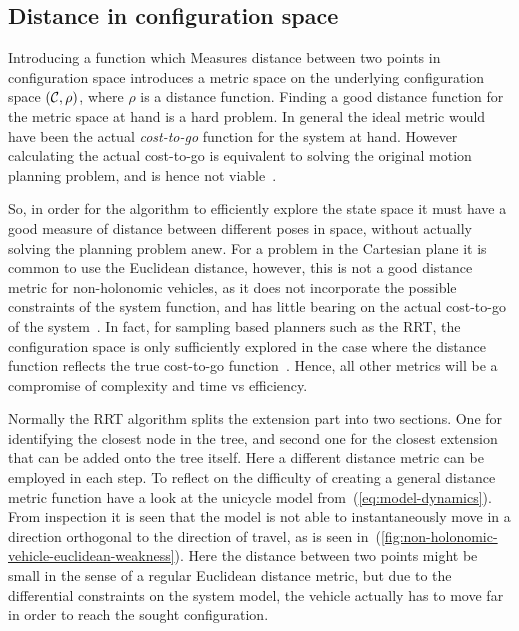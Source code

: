 \subsection{Distance in configuration space}

Introducing a function which Measures distance between two points in
configuration space introduces a metric space on the underlying configuration
space \((\mathcal{C}{},\rho)\), where \(\rho\) is a distance
function. Finding a good distance function for the metric space at hand is a
hard problem. In general the ideal metric would have been the actual
\textit{cost-to-go} function for the system at hand. However calculating the
actual cost-to-go is equivalent to solving the original motion planning problem,
and is hence not viable~\cite{pengchengReducingMetricSensitivity2001}.

So, in order for the \rrtfunnel{} algorithm to efficiently explore the state
space it must have a good measure of distance between different poses in space,
without actually solving the planning problem anew. For a problem in the
Cartesian plane it is common to use the Euclidean distance, however, this is not
a good distance metric for non-holonomic vehicles, as it does not incorporate
the possible constraints of the system function, and has little bearing on the
actual cost-to-go of the system~\cite{parkFeedbackMotionPlanning2015}. In fact,
for sampling based planners such as the \ac{RRT}, the configuration space is
only sufficiently explored in the case where the distance function reflects the
true cost-to-go function~\cite{pengchengReducingMetricSensitivity2001}. Hence,
all other metrics will be a compromise of complexity and time vs efficiency.

Normally the \ac{RRT} algorithm splits the extension part into two sections. One
for identifying the closest node in the tree, and second one for the closest
extension that can be added onto the tree itself. Here a different distance
metric can be employed in each step. To reflect on the difficulty of creating a
general distance metric function have a look at the unicycle model
from~(\ref{eq:model-dynamics}). From inspection it is seen that the model is not
able to instantaneously move in a direction orthogonal to the direction of
travel, as is seen in~(\ref{fig:non-holonomic-vehicle-euclidean-weakness}). Here
the distance between two points might be small in the sense of a regular
Euclidean distance metric, but due to the differential constraints on the system
model, the vehicle actually has to move far in order to reach the sought
configuration.

